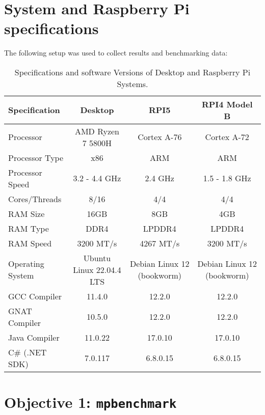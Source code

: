 \section{System and Raspberry Pi specifications}
\label{sec:sysetm_specs}

The following setup was used to collect results and benchmarking data:

\begin{table}[htbp]
	\centering
	\begin{tabular}{@{}lccc@{}}
		\toprule
		\textbf{Specification} & \textbf{Desktop} & \textbf{RPI5} & \textbf{RPI4 Model B} \\ 
		\midrule
		Processor             & AMD Ryzen 7 5800H & Cortex A-76 & Cortex A-72 \\
		Processor Type          & x86                      & ARM            & ARM \\
		Processor Speed        & 3.2 - 4.4 GHz       & 2.4 GHz       & 1.5 - 1.8 GHz\\
		Cores/Threads            & 8/16                    & 4/4                & 4/4 \\
		RAM Size                   & 16GB                  & 8GB              & 4GB \\
		RAM Type                  & DDR4                  & LPDDR4       & LPDDR4 \\
		RAM Speed                & 3200 MT/s           & 4267 MT/s    &3200 MT/s \\
		Operating System      & Ubuntu Linux 22.04.4 LTS & Debian Linux 12 (bookworm) &  Debian Linux 12 (bookworm)\\
		GCC Compiler           & 11.4.0               & 12.2.0        &  12.2.0\\
		GNAT Compiler         & 10.5.0               & 12.2.0        &  12.2.0\\
		Java Compiler            & 11.0.22            & 17.0.10      &  17.0.10\\
		C\# (.NET SDK)         & 7.0.117             & 6.8.0.15     &  6.8.0.15\\
		\bottomrule
	\end{tabular}
	\caption{Specifications and software Versions of Desktop and Raspberry Pi Systems\cite{desktop_specs}\cite{rpi_specs}\cite{rasp_pi5_pi4_comparision}.}
	\label{tab:spec_comparisons}
\end{table}

\section{Objective 1: \texttt{mpbenchmark}}

